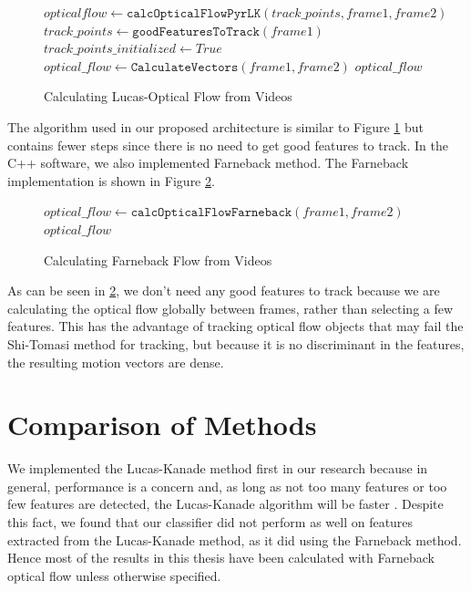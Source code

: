 \begin{figure}[h]
\begin{algorithmic}[1]
  	\State $opticalflow \gets \texttt{calcOpticalFlowPyrLK}(track\_points, frame1, frame2)$
  \Else
  	\State $track\_points \gets \texttt{goodFeaturesToTrack}(frame1)$
	  \State $track\_points\_initialized \gets True$
	  \State $optical\_flow \gets  \texttt{CalculateVectors}(frame1, frame2)$
  \EndIf
  \Return $optical\_flow$
\EndProcedure
\end{algorithmic}
\caption{Calculating Lucas-Optical Flow from Videos}
\label{alg:lk_flow}
\end{figure}

The algorithm used in our proposed architecture is similar to Figure \ref{alg:lk_flow} but
contains fewer steps since there is no need to get good features to track.
In the C++ software, we also implemented Farneback method. The
Farneback implementation is shown in Figure \ref{alg:farneback}.

\begin{figure}[h]
\begin{algorithmic}[1]
  \State $optical\_flow \gets \texttt{calcOpticalFlowFarneback}(frame1, frame2)$\\
  \Return $optical\_flow$
\EndProcedure
\end{algorithmic}
\caption{Calculating Farneback Flow from Videos}
\label{alg:farneback}
\end{figure}

As can be seen in \ref{alg:farneback}, we don't need any good features to track
because we are calculating the optical flow globally between frames, rather than
selecting a few features. This has the advantage of tracking optical flow objects
that may fail the Shi-Tomasi method for tracking, but because it is no discriminant
in the features, the resulting motion vectors are dense.


\section{\label{section:comparison}Comparison of Methods}
We implemented the Lucas-Kanade method first in our research because in general,
performance is a concern and, as long as not too many features or
too few features are detected, the Lucas-Kanade algorithm will be faster
\cite{de2015choosing}. Despite this fact, we found that our classifier did
not perform as well on features extracted from the Lucas-Kanade method, as it
did using the Farneback method. Hence most of the results in this thesis
have been calculated with Farneback optical flow unless otherwise specified.

